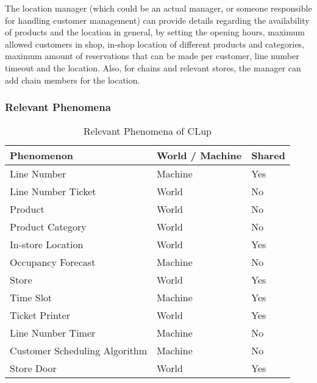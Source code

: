 The location manager (which could be an actual manager, or someone responsible for handling customer management) can provide details regarding the availability of products and the location in general, by setting the opening hours, maximum allowed customers in shop, in-shop location of different products and categories, maximum amount of reservations that can be made per customer, line number timeout and the location.
Also, for chains and relevant stores, the manager can add chain members for the location.

\subsubsection{Relevant Phenomena}

\begin{table}[H]
    \begin{tabular}{|p{4cm}|p{4cm}|p{4cm}|}
        \hline
        \textbf{Phenomenon}    & \textbf{World / Machine}       & \textbf{Shared } \\ \hline
        Line Number & Machine & Yes \\ \hline
        Line Number Ticket & World & No \\ \hline
        Product & World & No \\ \hline
        Product Category & World & No \\ \hline
        In-store Location & World & Yes \\ \hline
        Occupancy Forecast & Machine & No \\ \hline
        Store & World & Yes \\ \hline
        Time Slot & Machine & Yes \\ \hline
        Ticket Printer & World & Yes \\ \hline
        Line Number Timer & Machine & No \\ \hline
        Customer Scheduling Algorithm & Machine & No \\ \hline
        Store Door & World & Yes \\ \hline
    \end{tabular}
    \caption{Relevant Phenomena of CLup}
\end{table}



